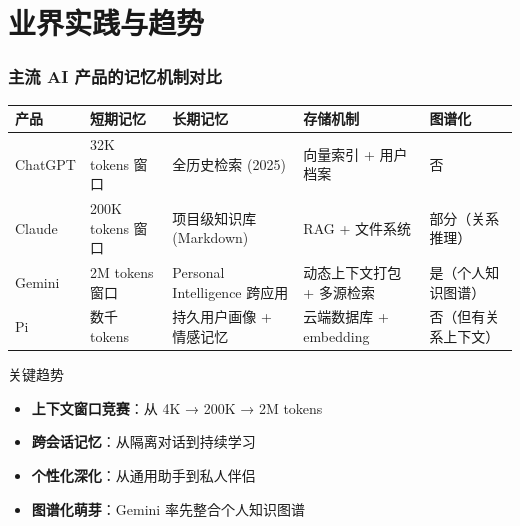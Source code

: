 \documentclass[aspectratio=169,10pt]{beamer}
\begin{document}
\section{业界实践与趋势}

\begin{frame}
  \frametitle{主流 AI 产品的记忆机制对比}

  \tiny
  \renewcommand{\arraystretch}{1.3}
  \begin{tabular}{>{\centering}p{1.5cm}|>{\centering}p{2.2cm}|>{\centering}p{2.2cm}|>{\centering}p{2.2cm}|>{\centering\arraybackslash}p{2cm}}
    \textbf{产品} & \textbf{短期记忆} & \textbf{长期记忆} & \textbf{存储机制} & \textbf{图谱化} \\
    \hline
    ChatGPT & 32K tokens 窗口 & 全历史检索 (2025) & 向量索引 + 用户档案 & 否 \\
    \hline
    Claude & 200K tokens 窗口 & 项目级知识库 (Markdown) & RAG + 文件系统 & 部分（关系推理） \\
    \hline
    Gemini & 2M tokens 窗口 & Personal Intelligence 跨应用 & 动态上下文打包 + 多源检索 & 是（个人知识图谱） \\
    \hline
    Pi & 数千 tokens & 持久用户画像 + 情感记忆 & 云端数据库 + embedding & 否（但有关系上下文） \\
  \end{tabular}

  \vspace{0.3cm}

  \begin{block}{关键趋势}
    \footnotesize
    \begin{itemize}
      \item \textbf{上下文窗口竞赛}：从 4K → 200K → 2M tokens
      \item \textbf{跨会话记忆}：从隔离对话到持续学习
      \item \textbf{个性化深化}：从通用助手到私人伴侣
      \item \textbf{图谱化萌芽}：Gemini 率先整合个人知识图谱
    \end{itemize}
  \end{block}
\end{frame}
\end{document}
